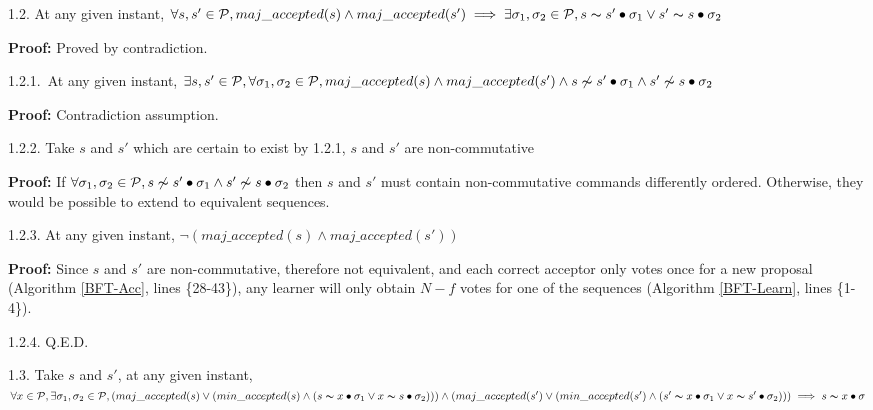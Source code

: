 \indent\indent\indent\parbox{\linewidth-\algorithmicindent*3}{\strut1.2. At any given instant, $\forall s,s' \in \mathcal{P}, maj\_accepted(s) \land maj\_accepted(s') \implies \exists \sigma_1,\sigma_2 \in \mathcal{P}, s \thicksim s' \bullet \sigma_1 \lor s' \thicksim s \bullet \sigma_2$}\par
\indent\indent\indent\indent\parbox{\linewidth}{\strut\textbf{Proof:} Proved by contradiction.}\par
\indent\indent\indent\indent\indent\parbox{\linewidth-\algorithmicindent*5}{\strut1.2.1.~At any given instant, $\exists s,s' \in \mathcal{P}, \forall \sigma_1,\sigma_2 \in \mathcal{P}, maj\_accepted(s) \land maj\_accepted(s') \wedge s \not\thicksim s' \bullet \sigma_1 \land s' \not\thicksim s \bullet \sigma_2$} \par
\indent\indent\indent\indent\indent\indent\parbox{\linewidth}{\strut\textbf{Proof:} Contradiction assumption.}\par
\indent\indent\indent\indent\indent\parbox{\linewidth-\algorithmicindent*5}{\strut1.2.2. Take $s$ and $s'$ which are certain to exist by 1.2.1, $s$ and $s'$ are non-commutative }\par
\indent\indent\indent\indent\indent\indent\parbox{\linewidth-\algorithmicindent*6}{\strut\textbf{Proof:} If $\forall \sigma_1,\sigma_2 \in \mathcal{P}, s \not\thicksim s' \bullet \sigma_1 \land s' \not\thicksim s \bullet \sigma_2$ then $s$ and $s'$ must contain non-commutative commands differently ordered. Otherwise, they would be possible to extend to equivalent sequences.}\par
\indent\indent\indent\indent\indent\parbox{\linewidth}{\strut1.2.3. At any given instant, $\neg (maj\_accepted(s) \land maj\_accepted(s'))$ } \par
\indent\indent\indent\indent\indent\indent\parbox{\linewidth-\algorithmicindent*6}{\strut\textbf{Proof:} Since $s$ and $s'$ are non-commutative, therefore not equivalent, and each correct acceptor only votes once for a new proposal (Algorithm \ref{BFT-Acc}, lines \{28-43\}), any learner will only obtain $N-f$ votes for one of the sequences (Algorithm \ref{BFT-Learn}, lines \{1-4\}).}\par
\indent\indent\indent\indent\indent\parbox{\linewidth}{\strut1.2.4. Q.E.D. }\par
\indent\indent\indent\parbox{\linewidth-\algorithmicindent*3}{\strut1.3. Take $s$ and $s'$, at any given instant, $\forall x \in \mathcal{P}, \exists \sigma_1,\sigma_2 \in \mathcal{P}, (maj\_accepted(s) \lor (min\_accepted(s) \land (s \thicksim x \bullet \sigma_1 \lor x \thicksim s \bullet \sigma_2))) \land (maj\_accepted(s') \lor (min\_accepted(s') \land (s' \thicksim x \bullet \sigma_1 \lor x \thicksim s' \bullet \sigma_2))) \implies s \thicksim x \bullet \sigma$}\par

